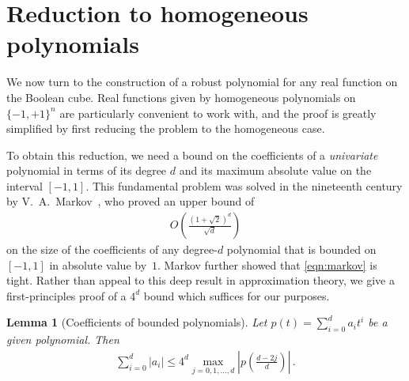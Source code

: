 \documentclass[10pt]{article}
\newtheorem{lemma}[theorem]{Lemma}
\theoremstyle{definition}
\numberwithin{equation}{section}
\newcommand{\moo}{\{-1,+1\}}
\newcommand{\moon}{\moo^n}
\newcommand{\PARENS}[1]{\left(#1\right)}
\newcommand{\ABS}[1]{\left\lvert #1 \right\rvert}
\newcommand{\abs}[1]{\lvert#1\rvert}
\begin{document}
\section{Reduction to homogeneous polynomials}
\label{sec:homogeneous}

We now turn to the construction of a robust polynomial
for any real function on the Boolean cube. Real
functions given by homogeneous polynomials on $\moon$ are
particularly convenient to work with, and the proof is
greatly simplified by first reducing the problem to the
homogeneous case. 

To obtain this reduction, we need a bound on the
coefficients of a \emph{univariate} polynomial in terms
of its degree $d$ and its maximum absolute value on
the interval $[-1,1]$. This fundamental problem was
solved in the nineteenth century by
V.~A.~Markov~\cite[p.~81]{markov-v-a1982least-dev}, who
proved an upper bound of 
\begin{align}
O\left(\frac{(1+\sqrt 2)^d}{\sqrt d}\right)
\label{eqn:markov}
\end{align}
on the size of the coefficients of any degree-$d$
polynomial that is bounded on $[-1,1]$ in absolute value by~$1$. 
Markov further showed that \eqref{eqn:markov} is
tight. Rather than appeal to this deep result in
approximation theory, we give a first-principles proof
of a $4^d$ bound which suffices for our purposes.


\begin{lemma}[Coefficients of bounded polynomials]
\label{lem:bound-poly-coeffs}
Let $p(t)=\sum_{i=0}^d a_it^i$ be a given polynomial. Then
\begin{align}
\label{eqn:bound-poly-coeffs}
\sum_{i=0}^d \abs{a_i} \leq 4^d 
\max_{j=0,1,\dots,d}\ABS{p\PARENS{\frac {d-2j}d}}\,.
\end{align}
\end{lemma}
\end{document}
